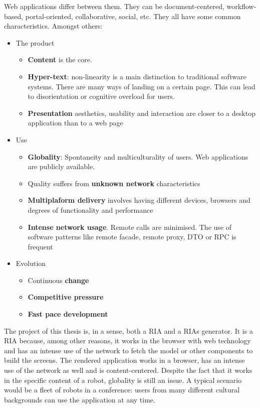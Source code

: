Web applications differ between them. 
They can be document-centered, workflow-based, portal-oriented, collaborative, social, etc. 
They all have some common characteristics. 
Amongst others:
\begin{itemize}
    \item The product
    \begin{itemize}
        \item \textbf{Content} is the core.
        \item \textbf{Hyper-text}: non-linearity is a main distinction to traditional software systems. There are many ways of landing on a certain page. This can lead to disorientation or cognitive overload for users.
        \item \textbf{Presentation} aesthetics, usability and interaction are closer to a desktop application than to a web page
    \end{itemize}
    \item Use
    \begin{itemize}
        \item \textbf{Globality}: Spontaneity and multiculturality of users. Web applications are publicly available.
        \item Quality suffers from\textbf{ unknown network} characteristics
        \item \textbf{Multiplaform delivery} involves having different devices, browsers and degrees of functionality and performance
        \item \textbf{Intense network usage}. Remote calls are minimised. The use of software patterns like remote facade, remote proxy, \ac{DTO} or \ac{RPC} is frequent
    \end{itemize}
    \item Evolution
    \begin{itemize}
         \item Continuous \textbf{change}
         \item \textbf{Competitive pressure}
         \item \textbf{Fast pace development}
    \end{itemize}   
\end{itemize}

The project of this thesis is, in a sense, both a \ac{RIA} and a \acp{RIA} generator. 
It is a \ac{RIA} because, among other reasons, it works in the browser with web technology and has an intense use of the network to fetch the model or other components to build the screens.
The rendered application works in a browser, has an intense use of the network as well and is content-centered.
Despite the fact that it works in the specific content of a robot, globality is still an issue.
A typical scenario would be a fleet of robots in a conference: users from many different cultural backgrounds can use the application at any time.


